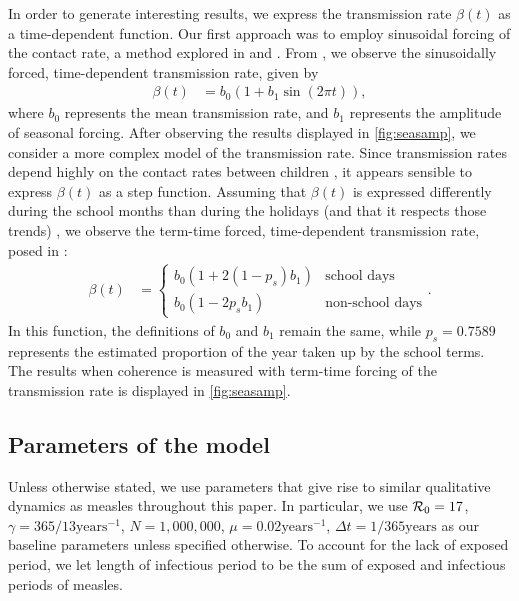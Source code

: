 \documentclass[12pt]{article}
\newcommand{\R}{{\cal R}}
\begin{document}
In order to generate interesting results, we express the transmission rate $\beta (t)$ as a time-dependent function. Our first approach was to employ sinusoidal forcing of the contact rate, a method explored in \cite{aron1984seasonality} and \cite{olsen1990chaos}. From \cite{keeling2002understanding}, we observe the sinusoidally forced, time-dependent transmission rate, given by
\begin{equation}
\begin{aligned}
\beta (t) &= b_0  (1 + b_1 \sin (2\pi t)),
\end{aligned}
\end{equation}
where $b_0$ represents the mean transmission rate, and $b_1$ represents the amplitude of seasonal forcing.
After observing the results displayed in \autoref{fig:seasamp}, we consider a more complex model of the transmission rate. Since transmission rates depend highly on the contact rates between children \cite{keeling2002understanding}, it appears sensible to express $\beta (t)$ as a step function. Assuming that $\beta (t)$ is expressed differently during the school months than during the holidays (and that it respects those trends) \cite{he2009plug}, we observe the term-time forced, time-dependent transmission rate, posed in \cite{bauch2003interepidemic}:
\begin{equation}
\begin{aligned}
\beta (t) &= 
\begin{cases} b_0 (1 + 2(1 - p_s) b_1) &\mbox{school days} \\ 
b_0 (1 - 2 p_s b_1) & \mbox{non-school days}
\end{cases}.
\end{aligned}
\end{equation}
In this function, the definitions of $b_0$ and $b_1$ remain the same, while $p_s = 0.7589$ represents the estimated proportion of the year taken up by the school terms. The results when coherence is measured with term-time forcing of the transmission rate is displayed in \autoref{fig:seasamp}.

\subsection{Parameters of the model}

Unless otherwise stated, we use parameters that give rise to similar qualitative dynamics as measles throughout this paper. In particular, we use $\R_0 = 17$, $\gamma = 365/13 \text{years}^{-1}$, $N = 1,000,000$, $\mu = 0.02 \text{years}^{-1}$, $\Delta t = 1/365 \text{years}$ as our baseline parameters \cite{earn2000simple} unless specified otherwise. To account for the lack of exposed period, we let length of infectious period to be the sum of exposed and infectious periods of measles. 
\end{document}
